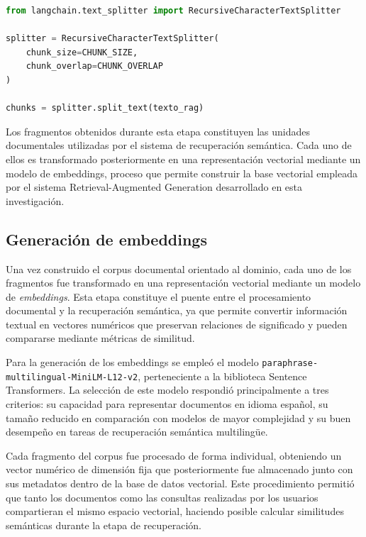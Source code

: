
\begin{lstlisting}[language=Python,
caption={Fragmentación conceptual del corpus documental.},
label={lst:chunking}]
from langchain.text_splitter import RecursiveCharacterTextSplitter

splitter = RecursiveCharacterTextSplitter(
    chunk_size=CHUNK_SIZE,
    chunk_overlap=CHUNK_OVERLAP
)

chunks = splitter.split_text(texto_rag)
\end{lstlisting}
Los fragmentos obtenidos durante esta etapa constituyen las unidades documentales utilizadas por el sistema de recuperación semántica. Cada uno de ellos es transformado posteriormente en una representación vectorial mediante un modelo de embeddings, proceso que permite construir la base vectorial empleada por el sistema Retrieval-Augmented Generation desarrollado en esta investigación.


\subsection{Generación de embeddings}

Una vez construido el corpus documental orientado al dominio, cada uno de los fragmentos fue transformado en una representación vectorial mediante un modelo de \textit{embeddings}. Esta etapa constituye el puente entre el procesamiento documental y la recuperación semántica, ya que permite convertir información textual en vectores numéricos que preservan relaciones de significado y pueden compararse mediante métricas de similitud.

Para la generación de los embeddings se empleó el modelo \texttt{paraphrase-multilingual-MiniLM-L12-v2}, perteneciente a la biblioteca Sentence Transformers. La selección de este modelo respondió principalmente a tres criterios: su capacidad para representar documentos en idioma español, su tamaño reducido en comparación con modelos de mayor complejidad y su buen desempeño en tareas de recuperación semántica multilingüe.

Cada fragmento del corpus fue procesado de forma individual, obteniendo un vector numérico de dimensión fija que posteriormente fue almacenado junto con sus metadatos dentro de la base de datos vectorial. Este procedimiento permitió que tanto los documentos como las consultas realizadas por los usuarios compartieran el mismo espacio vectorial, haciendo posible calcular similitudes semánticas durante la etapa de recuperación.

